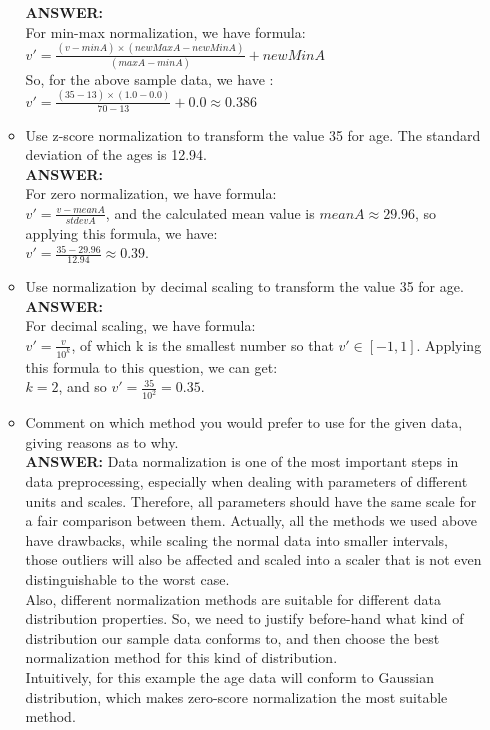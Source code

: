 \documentclass{article}
\begin{document}
\begin{enumerate}
\begin{itemize}
\textbf{ANSWER: } \\
For min-max normalization, we have formula: \\
$v' = \frac{(v - minA)\times (newMaxA - newMinA)}{(maxA - minA)} +
newMinA$ \\
So, for the above sample data, we have : \\ 
$v' = \frac{(35 - 13)\times (1.0 - 0.0)}{70 - 13} + 0.0 \approx 0.386$

\item Use z-score normalization to transform the value
  35 for age. The standard deviation of the ages is 12.94.\\

\textbf{ANSWER: } \\ 
For zero normalization, we have formula: \\ 
$v' = \frac{v - meanA}{stdevA}$, and the calculated mean value is
$meanA \approx 29.96$, so applying this formula, we have:\\
$v' = \frac{35 - 29.96}{12.94} \approx 0.39$.

\item Use normalization by decimal scaling to transform the value 35 for
  age. \\

\textbf{ANSWER: }\\
For decimal scaling, we have formula: \\
$v' = \frac{v}{10^k}$, of which k is the smallest number so that
$v'\in [-1,1]$. Applying this formula to this question, we can get: \\
$k = 2$, and so $v' = \frac{35}{10^2} = 0.35$. 

\item Comment on which method you would prefer to use for the given data,
giving reasons as to why. \\ 

\textbf{ANSWER: } Data normalization is one of the most important
steps in data preprocessing, especially when dealing with parameters
of different units and scales. Therefore, all parameters should have
the same scale for a fair comparison between them. Actually, all the
methods we used above have drawbacks, while scaling the normal data
into smaller intervals, those outliers will also be affected and
scaled into a scaler that is not even distinguishable to the worst
case. \\
Also, different normalization methods are suitable for different data
distribution properties. So, we need to justify before-hand what kind
of distribution our sample data conforms to, and then choose the best
normalization method for this kind of distribution. \\
Intuitively, for this example the age data will conform to Gaussian
distribution, which makes zero-score normalization the most suitable
method. 
\end{itemize}


\end{enumerate}
\end{document}
